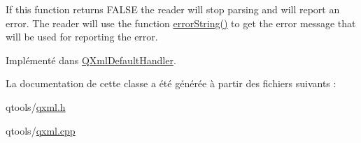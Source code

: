 If this function returns F\+A\+L\+S\+E the reader will stop parsing and will report an error. The reader will use the function \hyperlink{class_q_xml_decl_handler_a92d52f5e57b8041a956c30b92dd28161}{error\+String()} to get the error message that will be used for reporting the error. 

Implémenté dans \hyperlink{class_q_xml_default_handler_a3bb2a9a06a78ec957e3fed5a909a8e1c}{Q\+Xml\+Default\+Handler}.



La documentation de cette classe a été générée à partir des fichiers suivants \+:\begin{DoxyCompactItemize}
\item 
qtools/\hyperlink{qxml_8h}{qxml.\+h}\item 
qtools/\hyperlink{qxml_8cpp}{qxml.\+cpp}\end{DoxyCompactItemize}
